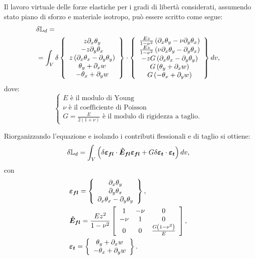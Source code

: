 Il lavoro virtuale delle forze elastiche per i gradi di libertà considerati, assumendo stato piano di sforzo e materiale isotropo, può essere scritto come segue:
\begin{align}
\label{eq:7plv2}
&\delta \mathbb{L}_d =\nonumber\\&=
\int_V\delta\left\{
\begin{array}{c}
z \partial_x\theta_y\\ 
-z \partial_y\theta_x\\ 
z \left(\partial_x\theta_x- \partial_y\theta_y\right)\\
\theta_y+\partial_x w\\
-\theta_x+\partial_y w
\end{array}\right\}\cdot
\left\{
\begin{array}{c}
\frac{Ez}{1-\nu^2}\left(\partial_x\theta_y- \nu\partial_y\theta_x\right)\\
\frac{Ez}{1-\nu^2}\left(\nu\partial_x\theta_y- \partial_y\theta_x\right)\\
-z G \left(\partial_x\theta_x- \partial_y\theta_y\right)\\
G\left(\theta_y+\partial_x w\right)\\
G\left(-\theta_x+\partial_y w\right)
\end{array}\right\}dv,
\end{align}
dove:
\begin{equation}
\label{eq:7plv3}
\left\{\begin{array}{l}
E\text{ è il modulo di Young}\\
\nu\text{ è il coefficiente di Poisson}\\
G = \frac{E}{2\left(1+\nu\right)}\text{ è il modulo di rigidezza a taglio.}
\end{array}\right.\nonumber
\end{equation}

Riorganizzando l'equazione e isolando i contributi flessionali e di taglio si ottiene:
\begin{equation}
\label{eq:7plv4}
\delta \mathbb{L}_d = \int_V\left(\delta\boldsymbol{\varepsilon_{fl}}\cdot\boldsymbol{\hat{E}_{fl}}\boldsymbol{\varepsilon_{fl}} +G\delta\boldsymbol{\varepsilon_{t}}\cdot\boldsymbol{\varepsilon_{t}}\right)dv,
\end{equation}
con
\begin{align}
\label{eq:7plv5}
&\boldsymbol{\varepsilon_{fl}} = \left\{
\begin{array}{c}
\partial_x\theta_y\\ 
\partial_y\theta_x\\ 
\partial_x\theta_x- \partial_y\theta_y
\end{array}\right\},\\
\label{eq:7plv5bis}
&\boldsymbol{\hat{E}_{fl}} = \frac{Ez^2}{1-\nu^2}\left[\begin{array}{ccc}
1 & -\nu & 0\\-\nu & 1 & 0\\0&0& \frac{G\left(1-\nu^2\right)}{E}\end{array}\right],\\
\label{eq:7plv5tris}
&\boldsymbol{\varepsilon_{t}} = \left\{
\begin{array}{c}
\theta_y+\partial_x w\\ 
-\theta_x+\partial_y w
\end{array}\right\}.
\end{align}


